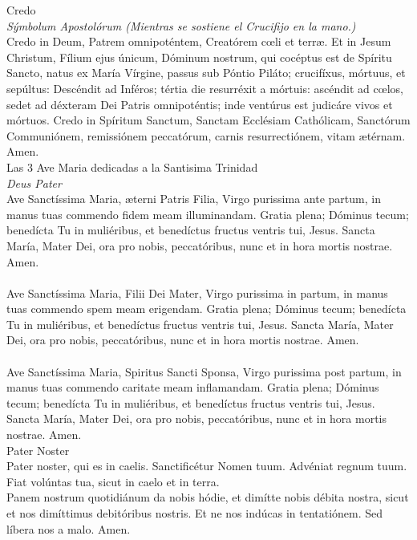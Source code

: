\documentclass[letterpaper, landscape, 10pt, twocolumn]{article}
\begin{document}
  \Large {\color{red} Credo}\\
  \normalsize {\color{red} \textit{ Sýmbolum Apostolórum (Mientras se sostiene el Crucifijo en la mano.)}}\\
  {\color{red} C}redo in Deum, Patrem omnipoténtem, Creatórem cœli et terræ. Et in Jesum Christum, Fílium ejus únicum, Dóminum nostrum, qui cocéptus est de Spíritu Sancto, natus ex María Vírgine, passus sub Póntio Piláto; crucifíxus, mórtuus, et sepúltus: Descéndit ad Inféros; tértia die resurréxit a mórtuis: ascéndit ad cœlos, sedet ad déxteram Dei Patris omnipoténtis; inde ventúrus est judicáre vivos et mórtuos. Credo in Spíritum Sanctum, Sanctam Ecclésiam Cathólicam, Sanctórum Communiónem, remissiónem peccatórum, carnis resurrectiónem, vitam ætérnam. {\color{red} A}men.\\

  \Large {\color{red} Las 3 Ave Maria dedicadas a la Santisima Trinidad}\\
  \normalsize {\color{red} \textit{Deus Pater}}\\
  {\color{red} A}ve Sanctíssima Maria, æterni Patris Filia, Virgo purissima ante partum, in manus tuas commendo fidem meam illuminandam. Gratia plena; Dóminus tecum; benedícta Tu in muliéribus, et benedíctus fructus ventris tui, Jesus. {\color{red} S}ancta María, Mater Dei, ora pro nobis, peccatóribus, nunc et in hora mortis nostrae. {\color{red} A}men.\\

  \\
  {\color{red} A}ve Sanctíssima Maria, Filii Dei Mater, Virgo purissima in partum, in manus tuas commendo spem meam erigendam. Gratia plena; Dóminus tecum; benedícta Tu in muliéribus, et benedíctus fructus ventris tui, Jesus. {\color{red} S}ancta María, Mater Dei, ora pro nobis, peccatóribus, nunc et in hora mortis nostrae. {\color{red} A}men.\\

  \\
  {\color{red} A}ve Sanctíssima Maria, Spiritus Sancti Sponsa, Virgo purissima post partum, in manus tuas commendo caritate meam inflamandam. Gratia plena; Dóminus tecum; benedícta Tu in muliéribus, et benedíctus fructus ventris tui, Jesus. {\color{red} S}ancta María, Mater Dei, ora pro nobis, peccatóribus, nunc et in hora mortis nostrae. {\color{red} A}men.\\

  \Large {\color{red} Pater Noster}\\
  \normalsize {\color{red} P}ater noster, qui es in caelis. Sanctificétur Nomen tuum. Advéniat regnum tuum. Fiat volúntas tua, sicut in caelo et in terra.\\
  {\color{red} P}anem nostrum quotidiánum da nobis hódie, et dimítte nobis débita nostra, sicut et nos dimíttimus debitóribus nostris. Et ne nos indúcas in tentatiónem. Sed líbera nos a malo. {\color{red} A}men.\\
\end{document}
